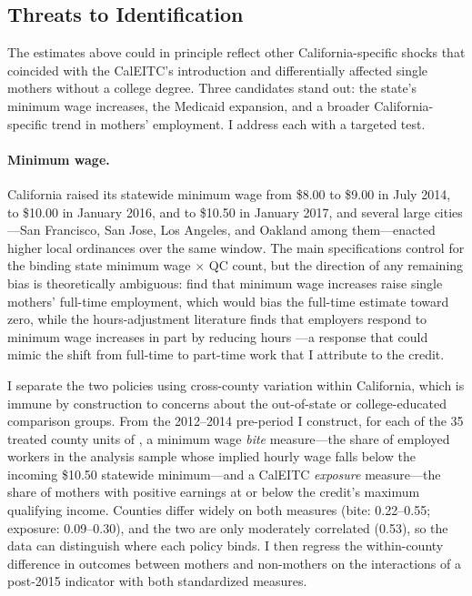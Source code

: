 \documentclass[11pt]{article}
\let\Cref\crtCref
\begin{document}
\subsection{Threats to Identification} \label{sec:threats}

The estimates above could in principle reflect other California-specific shocks that coincided with the CalEITC's introduction and differentially affected single mothers without a college degree. Three candidates stand out: the state's minimum wage increases, the Medicaid expansion, and a broader California-specific trend in mothers' employment. I address each with a targeted test.


\paragraph{Minimum wage.} California raised its statewide minimum wage from \$8.00 to \$9.00 in July 2014, to \$10.00 in January 2016, and to \$10.50 in January 2017, and several large cities---San Francisco, San Jose, Los Angeles, and Oakland among them---enacted higher local ordinances over the same window. The main specifications control for the binding state minimum wage $\times$ QC count, but the direction of any remaining bias is theoretically ambiguous: \cite{godoy_parental_2024} find that minimum wage increases raise single mothers' full-time employment, which would bias the full-time estimate toward zero, while the hours-adjustment literature finds that employers respond to minimum wage increases in part by reducing hours \citep{cengiz_effect_2019, jardim_minimum_2022}---a response that could mimic the shift from full-time to part-time work that I attribute to the credit.

I separate the two policies using cross-county variation within California, which is immune by construction to concerns about the out-of-state or college-educated comparison groups. From the 2012--2014 pre-period I construct, for each of the 35 treated county units of \Cref{tab:sdid}, a minimum wage \emph{bite} measure---the share of employed workers in the analysis sample whose implied hourly wage falls below the incoming \$10.50 statewide minimum---and a CalEITC \emph{exposure} measure---the share of mothers with positive earnings at or below the credit's maximum qualifying income. Counties differ widely on both measures (bite: 0.22--0.55; exposure: 0.09--0.30), and the two are only moderately correlated (0.53), so the data can distinguish where each policy binds. I then regress the within-county difference in outcomes between mothers and non-mothers on the interactions of a post-2015 indicator with both standardized measures.
\end{document}
